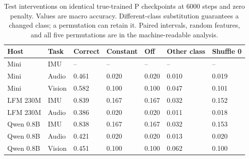 \begin{table}[!htbp]\centering\small
\setlength{\tabcolsep}{4pt}
\caption{Test interventions on identical true-trained P checkpoints at 6000 steps and zero penalty. Values are macro accuracy. Different-class substitution guarantees a changed class; a permutation can retain it. Paired intervals, random features, and all five permutations are in the machine-readable analysis.}\label{tab:interventions}
\begin{tabular}{@{}lllllll@{}}
\toprule
Host & Task & Correct & Constant & Off & Other class & Shuffle 0 \\
\midrule
Mini & IMU & -- & -- & -- & -- & -- \\
Mini & Audio & 0.461 & 0.020 & 0.020 & 0.010 & 0.019 \\
Mini & Vision & 0.582 & 0.100 & 0.100 & 0.047 & 0.101 \\
LFM 230M & IMU & 0.839 & 0.167 & 0.167 & 0.032 & 0.152 \\
LFM 230M & Audio & 0.386 & 0.020 & 0.020 & 0.011 & 0.018 \\
Qwen 0.8B & IMU & 0.838 & 0.167 & 0.167 & 0.032 & 0.153 \\
Qwen 0.8B & Audio & 0.421 & 0.020 & 0.020 & 0.013 & 0.020 \\
Qwen 0.8B & Vision & 0.451 & 0.100 & 0.100 & 0.062 & 0.100 \\
\bottomrule
\end{tabular}
\end{table}\par
